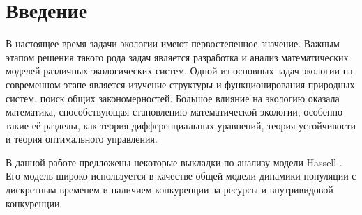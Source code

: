\section{Введение}
    
    В настоящее время задачи экологии имеют первостепенное значение. Важным этапом решения такого рода задач является разработка и анализ математических моделей различных экологических систем. Одной из основных задач экологии на современном этапе является изучение структуры и функционирования природных систем, поиск общих закономерностей. Большое влияние на экологию оказала математика, способствующая становлению математической экологии, особенно такие её разделы, как теория дифференциальных уравнений, теория устойчивости и теория оптимального управления.

    В данной работе предложены некоторые выкладки по анализу модели Hassell . Его модель широко используется в качестве общей модели динамики популяции с дискретным временем и наличием конкуренции за ресурсы и внутривидовой конкуренции. 





